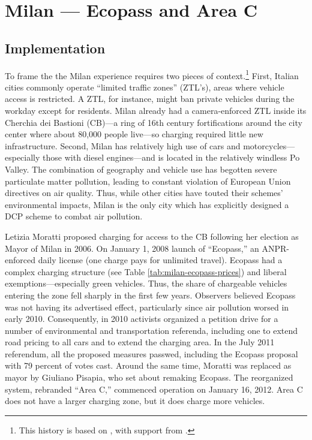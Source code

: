 \section{Milan --- Ecopass and Area C}\label{sec:milan}

\subsection{Implementation}

To frame the the Milan experience requires two pieces of context.\footnote{This history is based on \citet{Mattioli2012}, with support from \citep{Rotaris2010}.} First, Italian cities commonly operate ``limited traffic zones'' (ZTL's), areas where vehicle access is restricted. A ZTL, for instance, might ban private vehicles during the workday except for residents. Milan already had a camera-enforced ZTL inside its Cherchia dei Bastioni (CB)---a ring of 16th century fortifications around the city center where about 80,000 people live---so charging required little new infrastructure. Second, Milan has relatively high use of cars and motorcycles---especially those with diesel engines---and is located in the relatively windless Po Valley. The combination of geography and vehicle use has begotten severe particulate matter pollution, leading to constant violation of European Union directives on air quality. Thus, while other cities have touted their schemes' environmental impacts, Milan is the only city which has explicitly designed a DCP scheme to combat air pollution.

 Letizia Moratti proposed charging for access to the CB following her election as Mayor of Milan in 2006. On January 1, 2008 launch of ``Ecopass,'' an ANPR-enforced daily license (one charge pays for unlimited travel). Ecopass had a complex charging structure (see Table \ref{tab:milan-ecopass-prices}) and liberal exemptions---especially green vehicles. Thus, the share of chargeable vehicles entering the zone fell sharply in the first few years. Observers believed Ecopass was not having its advertised effect, particularly since air pollution worsed in early 2010. Consequently, in 2010 activists organized a petition drive for a number of environmental and transportation referenda, including one to extend road pricing to all cars and to extend the charging area. In the July 2011 referendum, all the proposed measures passwed, including the Ecopass proposal with 79 percent of votes cast. Around the same time, Moratti was replaced as mayor by Giuliano Pisapia, who set about remaking Ecopass. The reorganized system, rebranded ``Area C,'' commenced operation on January 16, 2012. Area C does not have a larger charging zone, but it does charge more vehicles.

